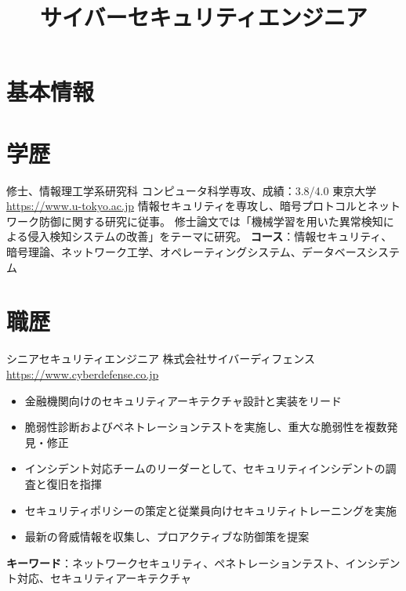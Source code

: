\documentclass[a4paper, serif, 10pt]{moderncv}
\title{サイバーセキュリティエンジニア}
\begin{document}
\maketitle

\section{基本情報}

\section{学歴}

        {修士、情報理工学系研究科 コンピュータ科学専攻、成績：3.8/4.0}
        {東京大学}
        {\url{https://www.u-tokyo.ac.jp}}
        {}
        {情報セキュリティを専攻し、暗号プロトコルとネットワーク防御に関する研究に従事。
修士論文では「機械学習を用いた異常検知による侵入検知システムの改善」をテーマに研究。
\textbf{コース}：情報セキュリティ、暗号理論、ネットワーク工学、オペレーティングシステム、データベースシステム}
\section{職歴}

        {シニアセキュリティエンジニア}
        {株式会社サイバーディフェンス}
        {\url{https://www.cyberdefense.co.jp}}
        {}
        {\begin{itemize}
\item 金融機関向けのセキュリティアーキテクチャ設計と実装をリード
\item 脆弱性診断およびペネトレーションテストを実施し、重大な脆弱性を複数発見・修正
\item インシデント対応チームのリーダーとして、セキュリティインシデントの調査と復旧を指揮
\item セキュリティポリシーの策定と従業員向けセキュリティトレーニングを実施
\item 最新の脅威情報を収集し、プロアクティブな防御策を提案
\end{itemize}
\textbf{キーワード}：ネットワークセキュリティ、ペネトレーションテスト、インシデント対応、セキュリティアーキテクチャ}
\end{document}
